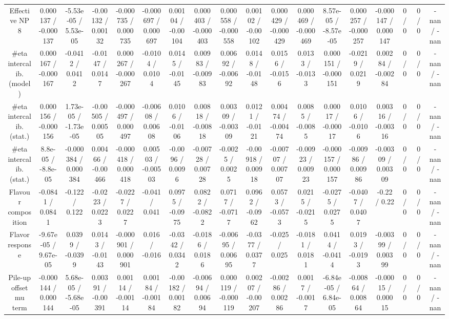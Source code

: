 \documentclass[10pt]{article}
\begin{document}
\begin{table}[htbp]
\begin{center}
\begin{tabular}{|c|c|c|c|c|c|c|c|c|c|c|c|c|c|c|c|c|c|}
  Effective NP 8 & 0.000137 / -0.000137 & -5.53e-05 / 5.53e-05 & -0.00132 / 0.00132 & -0.000735 / 0.000735 & -0.000697 / 0.000697 & 0.00104 / -0.00104 & 0.000403 / -0.000403 & 0.000558 / -0.000558 & 0.00102 / -0.00102 & 0.000429 / -0.000429 & 0.000469 / -0.000469 & 8.57e-05 / -8.57e-05 & 0.000257 / -0.000257 & -0.000147 / 0.000147 & 0 / 0 & 0 / 0 & -nan / -nan \\ 
  #eta intercalib. (model) & 0.000167 / -0.000167 & -0.0412 / 0.0412 & -0.0147 / 0.0147 & 0.000267 / -0.000267 & -0.0104 / 0.0104 & 0.0145 / -0.0145 & 0.00983 / -0.00983 & 0.00692 / -0.00692 & 0.0148 / -0.0148 & 0.0156 / -0.0156 & 0.0133 / -0.0133 & 0.000151 / -0.000151 & -0.0219 / 0.0219 & 0.00284 / -0.00284 & 0 / 0 & 0 / 0 & -nan / -nan \\ 
  #eta intercalib. (stat.) & 0.000156 / -0.000156 & 1.73e-05 / -1.73e-05 & -0.00505 / 0.00505 & -0.000497 / 0.000497 & -0.00608 / 0.00608 & 0.0106 / -0.0106 & 0.00818 / -0.00818 & 0.00309 / -0.00309 & 0.0121 / -0.0121 & 0.00474 / -0.00474 & 0.0085 / -0.0085 & 0.00017 / -0.00017 & 0.0106 / -0.0106 & 0.00316 / -0.00316 & 0 / 0 & 0 / 0 & -nan / -nan \\ 
  #eta intercalib. (stat.) & 8.8e-05 / -8.8e-05 & -0.000384 / 0.000384 & 0.00466 / -0.00466 & -0.000418 / 0.000418 & 0.00503 / -0.00503 & -0.0096 / 0.0096 & -0.00728 / 0.00728 & -0.0025 / 0.0025 & -0.00918 / 0.00918 & -0.00707 / 0.00707 & -0.00923 / 0.00923 & -0.000157 / 0.000157 & -0.00986 / 0.00986 & -0.00309 / 0.00309 & 0 / 0 & 0 / 0 & -nan / -nan \\ 
  Flavour composition & -0.0841 / 0.0841 & -0.122 / 0.122 & -0.0223 / 0.0223 & -0.0227 / 0.0227 & -0.041 / 0.041 & 0.0975 / -0.0975 & 0.0822 / -0.0822 & 0.0717 / -0.0717 & 0.0962 / -0.0962 & 0.0573 / -0.0573 & 0.0215 / -0.0215 & -0.0275 / 0.0275 & -0.0407 / 0.0407 & -0.22 / 0.22 & 0 / 0 & 0 / 0 & -nan / -nan \\ 
  Flavor response & -9.67e-05 / 9.67e-05 & 0.0399 / -0.0399 & 0.0143 / -0.0143 & -0.000901 / 0.000901 & 0.016 / -0.016 & -0.0342 / 0.0342 & -0.0186 / 0.0186 & -0.00695 / 0.00695 & -0.0377 / 0.0377 & -0.025 / 0.025 & -0.0181 / 0.0181 & 0.0414 / -0.0414 & 0.0193 / -0.0193 & -0.00399 / 0.00399 & 0 / 0 & 0 / 0 & -nan / -nan \\ 
  Pile-up offset mu term & -0.000144 / 0.000144 & 5.68e-05 / -5.68e-05 & 0.00391 / -0.00391 & 0.00114 / -0.00114 & 0.00184 / -0.00184 & -0.00182 / 0.00182 & -0.00694 / 0.00694 & 0.000119 / -0.000119 & 0.00207 / -0.00207 & -0.00286 / 0.00286 & 0.0017 / -0.0017 & -6.84e-05 / 6.84e-05 & -0.00864 / 0.00864 & -0.00015 / 0.00015 & 0 / 0 & 0 / 0 & -nan / -nan \\ 

\end{tabular}
\end{center}
\end{table}
\end{document}
